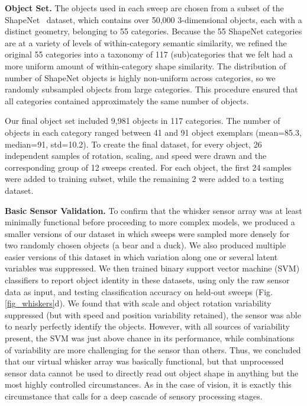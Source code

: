 \textbf{Object Set.} The objects used in each sweep are chosen from a subset of the ShapeNet~\cite{Chang2015} dataset, which contains over 50,000 3-dimensional objects, each with a distinct geometry, belonging to 55 categories.
Because the 55 ShapeNet categories are at a variety of levels of within-category semantic similarity, we refined the original 55 categories into a taxonomy of 117 (sub)categories that we felt had a more uniform amount of within-category shape similarity. 
The distribution of number of ShapeNet objects is highly non-uniform across categories, so we randomly subsampled objects from large categories.  
This procedure ensured that all categories contained approximately the same number of objects.  

Our final object set included 9,981 objects in 117 categories.  The number of objects in each category ranged between 41 and 91 object exemplars (mean=85.3, median=91, std=10.2). 
To create the final dataset, for every object, 26 independent samples of rotation, scaling, and speed were drawn and the corresponding group of 12 sweeps created.   
For each object, the first 24 samples were added to training subset, while the remaining 2 were added to a testing dataset. 


\textbf{Basic Sensor Validation.} To confirm that the whisker sensor array was at least minimally functional before proceeding to more complex models, we produced a smaller versions of our dataset in which sweeps were sampled more densely for two randomly chosen objects (a bear and a duck).  
We also produced multiple easier versions of this dataset in which variation along one or several latent variables was suppressed. 
We then trained binary support vector machine (SVM) classifiers to report object identity in these datasets, using only the raw sensor data as input, and testing classification accuracy on held-out sweeps (Fig. \ref{fig_whiskers}d).  We found that with scale and object rotation variability suppressed (but with speed and position variability retained), the sensor was able to nearly perfectly identify the objects.  
However, with all sources of variability present, the SVM was just above chance in its performance,  
while combinations of variability are more challenging for the sensor than others. 
Thus, we concluded that our virtual whisker array was basically functional, but that unprocessed sensor data cannot be used to directly read out object shape in anything but the most highly controlled circumstances.
As in the case of vision, it is exactly this circumstance that calls for a deep cascade of sensory processing stages. 

